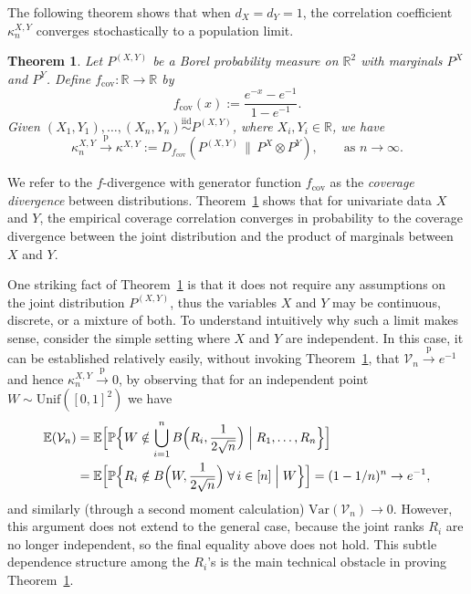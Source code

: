 \documentclass[11pt]{article}
\newtheorem{thm}{Theorem}
\newcommand{\var}{\mathrm{Var}}
\newcommand{\pto}{\xrightarrow{\,\mathrm{p}\,} }
\newcommand{\iid}{\stackrel{\mathrm{iid}}\sim}
\begin{document}
The following theorem shows that when $d_X=d_Y=1$, the correlation coefficient $\kappa^{X,Y}_n$ converges stochastically to a population limit.
\begin{thm}
\label{Thm:populationlimit}
Let $P^{(X,Y)}$ be a Borel probability measure on $\mathbb{R}^{2}$ with marginals $P^X$ and $P^Y$. Define $f_{\mathrm{cov}}:\mathbb{R}\to\mathbb{R}$ by
\begin{equation}
\label{Eq:fcov}
f_{\mathrm{cov}}(x) := \frac{e^{-x}-e^{-1}}{1-e^{-1}}.
\end{equation}
Given $(X_1,Y_1),\ldots,(X_n,Y_n)\iid P^{(X,Y)}$, where $X_i, Y_i\in\mathbb{R}$, we have
\begin{equation}
\label{eq:f-divergence}
\kappa_n^{X,Y} \pto \kappa^{X,Y} := D_{f_{\mathrm{cov}}}(P^{(X,Y)}\,\|\,P^X\otimes P^Y), 
\qquad \text{as } n\to\infty .
\end{equation}
\end{thm}

We refer to the $f$-divergence with generator function $f_{\mathrm{cov}}$ as the \emph{coverage divergence} between distributions. Theorem~\ref{Thm:populationlimit} shows that for univariate data $X$ and $Y$, the empirical coverage correlation converges in probability to the coverage divergence between the joint distribution and the product of marginals between $X$ and $Y$.

One striking fact of Theorem~\ref{Thm:populationlimit} is that it does not require any assumptions on the joint distribution $P^{(X,Y)}$, thus the variables $X$ and $Y$ may be continuous, discrete, or a mixture of both. To understand intuitively why such a limit makes sense, consider the simple setting where $X$ and $Y$ are independent. In this case, it can be established relatively easily, without invoking Theorem~\ref{Thm:populationlimit}, that 
$\mathcal{V}_n \pto e^{-1}$ and hence $\kappa^{X,Y}_n\pto  0$,  by observing that for an independent point $W\sim \mathrm{Unif}([0,1]^2)$ we have 
\begin{align}
\mathbb{E}(\mathcal{V}_n) &= \mathbb{E}\Bigl[\mathbb{P}\Bigl\{W\notin\bigcup_{i=1}^n B\Bigl(R_i, \frac{1}{2\sqrt{n}}\Bigr)\Bigm | R_1,\ldots, R_n\Bigr\}\Bigr]\nonumber\\
&=\mathbb{E}\Bigl[\mathbb{P}\Bigl\{R_i\notin B\Bigl(W, \frac{1}{2\sqrt{n}}\Bigr)\;\forall\, i\in[n]\Bigm | W\Bigr\}\Bigr]=(1-1/n)^n\to e^{-1},\label{Eq:NullLimit}
\end{align}
and similarly (through a second moment calculation) $\var(\mathcal{V}_n) \to 0$.  However, this argument does not extend to the general case, because the joint ranks $R_i$ are no longer independent, so the final equality above does not hold. This subtle dependence structure among the $R_i$'s is the main technical obstacle in proving Theorem~\ref{Thm:populationlimit}. 
\end{document}
